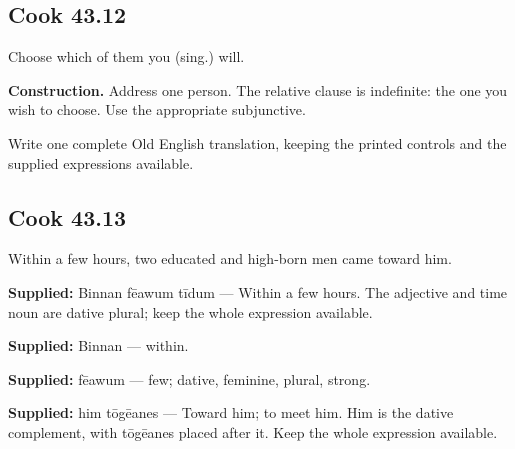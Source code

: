\par\begin{minipage}{\linewidth}\raggedright
\subsection*{Cook 43.12}

Choose which of them you (sing.) will.

\textbf{Construction.} Address one person. The relative clause is indefinite: the one you wish to choose. Use the appropriate subjunctive.

Write one complete Old English translation, keeping the printed controls and the supplied expressions available.

\end{minipage}\par\addvspace{4pt}

\par\begin{minipage}{\linewidth}\raggedright
\subsection*{Cook 43.13}

Within a few hours, two educated and high-born men came toward him.

\end{minipage}\par\addvspace{4pt}

\textbf{Supplied:} Binnan fēawum tīdum — Within a few hours. The adjective and time noun are dative plural; keep the whole expression available.

\textbf{Supplied:} Binnan — within.

\textbf{Supplied:} fēawum — few; dative, feminine, plural, strong.

\textbf{Supplied:} him tōgēanes — Toward him; to meet him. Him is the dative complement, with tōgēanes placed after it. Keep the whole expression available.


